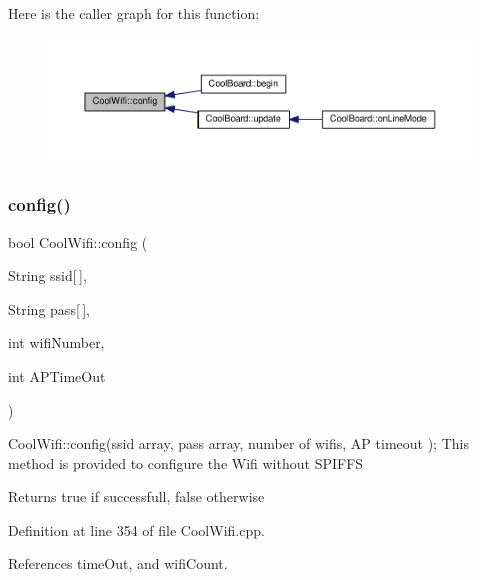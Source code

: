 Here is the caller graph for this function\+:
\nopagebreak
\begin{figure}[H]
\begin{center}
\leavevmode
\includegraphics[width=350pt]{classCoolWifi_a4eb2f6b9b09dd588964b88b6c70122c0_icgraph}
\end{center}
\end{figure}
\mbox{\label{classCoolWifi_a871d4a0d9978f17fdf6d874fc2958b6c}} 
\subsubsection{\texorpdfstring{config()}{config()}\hspace{0.1cm}{\footnotesize\ttfamily [2/2]}}
{\footnotesize\ttfamily bool Cool\+Wifi\+::config (\begin{DoxyParamCaption}\item[{String}]{ssid\mbox{[}$\,$\mbox{]},  }\item[{String}]{pass\mbox{[}$\,$\mbox{]},  }\item[{int}]{wifi\+Number,  }\item[{int}]{A\+P\+Time\+Out }\end{DoxyParamCaption})}

Cool\+Wifi\+::config(ssid array, pass array, number of wifis, A\+P timeout ); This method is provided to configure the Wifi without S\+P\+I\+F\+FS

\begin{DoxyReturn}{Returns}
true if successfull, false otherwise 
\end{DoxyReturn}


Definition at line 354 of file Cool\+Wifi.\+cpp.



References time\+Out, and wifi\+Count.


